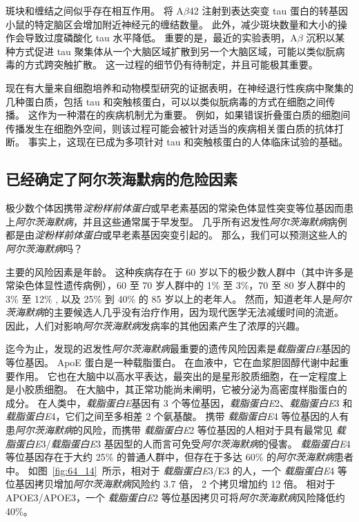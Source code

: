 斑块和缠结之间似乎存在相互作用。
将 A$\beta$42 注射到表达突变 tau 蛋白的转基因小鼠的特定脑区会增加附近神经元的缠结数量。
此外，减少斑块数量和大小的操作会导致过度磷酸化 tau 水平降低。
重要的是，最近的实验表明，A$\beta$ 沉积以某种方式促进 tau 聚集体从一个大脑区域扩散到另一个大脑区域，可能以类似朊病毒的方式跨突触扩散。
这一过程的细节仍有待制定，并且可能极其重要。


现在有大量来自细胞培养和动物模型研究的证据表明，在神经退行性疾病中聚集的几种蛋白质，包括 tau 和突触核蛋白，可以以类似朊病毒的方式在细胞之间传播。
这作为一种潜在的疾病机制尤为重要。
例如，如果错误折叠蛋白质的细胞间传播发生在细胞外空间，则该过程可能会被针对适当的疾病相关蛋白质的抗体打断。
事实上，这现在已成为多项针对 tau 和突触核蛋白的人体临床试验的基础。



\subsection{已经确定了阿尔茨海默病的危险因素}

极少数个体因携带\textit{淀粉样前体蛋白}或早老素基因的常染色体显性突变等位基因而患上\textit{阿尔茨海默病}，并且这些通常属于早发型。
几乎所有迟发性\textit{阿尔茨海默病}病例都是由\textit{淀粉样前体蛋白}或早老素基因突变引起的。
那么，我们可以预测这些人的\textit{阿尔茨海默病}吗？


主要的风险因素是年龄。
这种疾病存在于 60 岁以下的极少数人群中（其中许多是常染色体显性遗传病例），60 至 70 岁人群中的 1\% 至 3\%，70 至 80 岁人群中的 3\% 至 12\% , 以及 25\% 到 40\% 的 85 岁以上的老年人。
然而，知道老年人是\textit{阿尔茨海默病}的主要候选人几乎没有治疗作用，因为现代医学无法减缓时间的流逝。
因此，人们对影响\textit{阿尔茨海默病}发病率的其他因素产生了浓厚的兴趣。


迄今为止，发现的迟发性\textit{阿尔茨海默病}最重要的遗传风险因素是\textit{载脂蛋白E}基因的等位基因。
ApoE 蛋白是一种载脂蛋白。
在血液中，它在血浆胆固醇代谢中起重要作用。
它也在大脑中以高水平表达，最突出的是星形胶质细胞，在一定程度上是小胶质细胞。
在大脑中，其正常功能尚未阐明，它被分泌为高密度样脂蛋白的成分。
在人类中，\textit{载脂蛋白E}基因有 3 个等位基因，\textit{载脂蛋白E}2、\textit{载脂蛋白E}3 和 \textit{载脂蛋白E}4，它们之间至多相差 2 个氨基酸。
携带 \textit{载脂蛋白E}4 等位基因的人有患\textit{阿尔茨海默病}的风险，而携带 \textit{载脂蛋白E}2 等位基因的人相对于具有最常见 \textit{载脂蛋白E}3/\textit{载脂蛋白E}3 基因型的人而言可免受\textit{阿尔茨海默病}的侵害。
\textit{载脂蛋白E}4 等位基因存在于大约 25\% 的普通人群中，但存在于多达 60\% 的\textit{阿尔茨海默病}患者中。
如图~\ref{fig:64_14}~所示，相对于 \textit{载脂蛋白E}3/E3 的人，一个 \textit{载脂蛋白E}4 等位基因拷贝增加\textit{阿尔茨海默病}风险约 3.7 倍， 2 个拷贝增加约 12 倍。
相对于 APOE3/APOE3，一个 \textit{载脂蛋白E}2 等位基因拷贝可将\textit{阿尔茨海默病}风险降低约 40\%。


